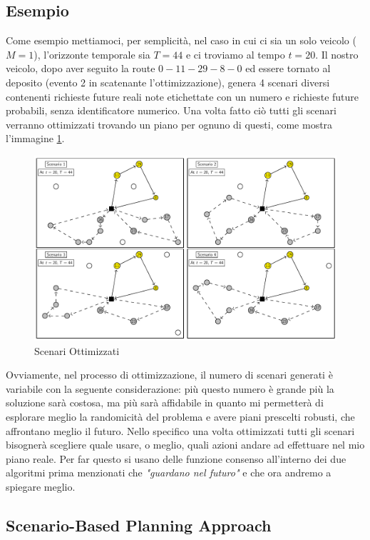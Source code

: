 \documentclass[
    article,            %
    12pt,                %
    oneside,            %
    a4paper,            %
    english,            %
    italian,                %
    sumario=tradicional,
]{abntex2}
\begin{document}
\subsection{Esempio}
Come esempio mettiamoci, per semplicità, nel caso in cui ci sia un solo veicolo ($M=1$), l'orizzonte temporale sia $T = 44$ e ci troviamo al tempo $t=20$. Il nostro veicolo, dopo aver seguito la route {\(0 - 11 - 29 - 8 - 0\)} ed essere tornato al deposito (evento 2 in  scatenante l'ottimizzazione), genera 4 scenari diversi contenenti richieste future reali note etichettate con un numero e richieste future probabili, senza identificatore numerico. Una volta fatto ciò tutti gli scenari verranno ottimizzati trovando un piano per ognuno di questi, come mostra l'immagine \ref{fig:optimizedScenario}. 
\begin{figure}[h!]
    \centering
    \includegraphics[scale=0.43]{Images/OptimizedScenario.png}
    \caption{Scenari Ottimizzati}
    \label{fig:optimizedScenario}
\end{figure}
\newline
Ovviamente, nel processo di ottimizzazione, il numero di scenari generati è variabile con la seguente considerazione: più questo numero è grande più la soluzione sarà costosa, ma più sarà affidabile in quanto mi permetterà di esplorare meglio la randomicità del problema e avere piani prescelti robusti, che affrontano meglio il futuro. Nello specifico una volta ottimizzati tutti gli scenari  bisognerà scegliere quale usare, o meglio, quali azioni andare ad effettuare nel mio piano reale. Per far questo si usano delle funzione consenso all'interno dei due algoritmi prima menzionati che \textit{"guardano nel futuro"} e che ora andremo a spiegare meglio.

\hypertarget{sbpa}{%
\subsection{Scenario-Based Planning Approach}\label{sbpa}}
\end{document}
